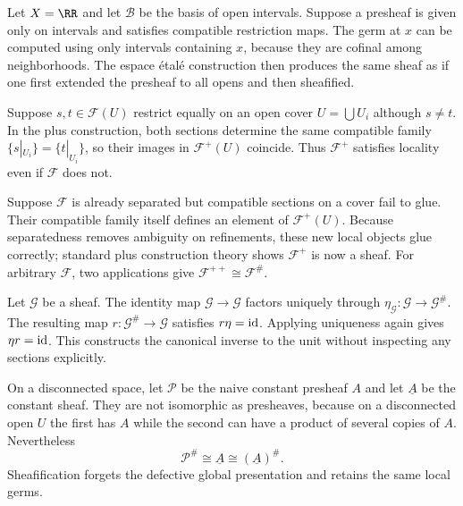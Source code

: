 \begin{example}
Let $X=\RR$ and let $\mathcal B$ be the basis of open intervals.  Suppose a presheaf is given
only on intervals and satisfies compatible restriction maps.  The germ at $x$ can be
computed using only intervals containing $x$, because they are cofinal among neighborhoods.
The espace \'{e}tal\'{e} construction then produces the same sheaf as if one first extended
the presheaf to all opens and then sheafified.
\end{example}

\begin{example}
Suppose $s,t\in\mathcal F(U)$ restrict equally on an open cover $U=\bigcup U_i$ although
$s\neq t$.  In the plus construction, both sections determine the same compatible family
$\{s|_{U_i}\}=\{t|_{U_i}\}$, so their images in $\mathcal F^+(U)$ coincide.  Thus
$\mathcal F^+$ satisfies locality even if $\mathcal F$ does not.
\end{example}

\begin{example}
Suppose $\mathcal F$ is already separated but compatible sections on a cover fail to glue.
Their compatible family itself defines an element of $\mathcal F^+(U)$.  Because separatedness
removes ambiguity on refinements, these new local objects glue correctly; standard plus
construction theory shows $\mathcal F^+$ is now a sheaf.  For arbitrary $\mathcal F$, two
applications give $\mathcal F^{++}\cong\mathcal F^\#$.
\end{example}

\begin{example}
Let $\mathcal G$ be a sheaf.  The identity map $\mathcal G\to\mathcal G$ factors uniquely
through $\eta_{\mathcal G}:\mathcal G\to\mathcal G^\#$.  The resulting map
$r:\mathcal G^\#\to\mathcal G$ satisfies $r\eta=\operatorname{id}$.  Applying uniqueness again gives
$\eta r=\operatorname{id}$.  This constructs the canonical inverse to the unit without inspecting any
sections explicitly.
\end{example}

\begin{example}
On a disconnected space, let $\mathcal P$ be the naive constant presheaf $A$ and let
$\underline A$ be the constant sheaf.  They are not isomorphic as presheaves, because on a
disconnected open $U$ the first has $A$ while the second can have a product of several
copies of $A$.  Nevertheless
\[
\mathcal P^\#\cong\underline A\cong(\underline A)^\#.
\]
Sheafification forgets the defective global presentation and retains the same local germs.
\end{example}
